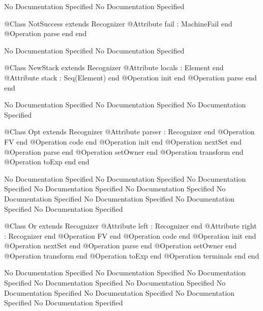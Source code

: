 No Documentation Specified
No Documentation Specified
\begin{Interface}
@Class NotSuccess extends Recognizer
  @Attribute fail : MachineFail end
  @Operation parse end
end
\end{Interface}
No Documentation Specified
No Documentation Specified
\begin{Interface}
@Class NewStack extends Recognizer
  @Attribute locals : Element end
  @Attribute stack : Seq(Element) end
  @Operation init end
  @Operation parse end
end
\end{Interface}
No Documentation Specified
No Documentation Specified
No Documentation Specified
\begin{Interface}
@Class Opt extends Recognizer
  @Attribute parser : Recognizer end
  @Operation FV end
  @Operation code end
  @Operation init end
  @Operation nextSet end
  @Operation parse end
  @Operation setOwner end
  @Operation transform end
  @Operation toExp end
end
\end{Interface}
No Documentation Specified
No Documentation Specified
No Documentation Specified
No Documentation Specified
No Documentation Specified
No Documentation Specified
No Documentation Specified
No Documentation Specified
No Documentation Specified
\begin{Interface}
@Class Or extends Recognizer
  @Attribute left : Recognizer end
  @Attribute right : Recognizer end
  @Operation FV end
  @Operation code end
  @Operation init end
  @Operation nextSet end
  @Operation parse end
  @Operation setOwner end
  @Operation transform end
  @Operation toExp end
  @Operation terminals end
end
\end{Interface}
No Documentation Specified
No Documentation Specified
No Documentation Specified
No Documentation Specified
No Documentation Specified
No Documentation Specified
No Documentation Specified
No Documentation Specified
No Documentation Specified

